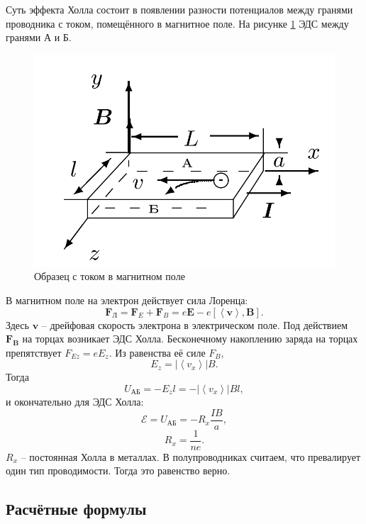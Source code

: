 \documentclass[a4paper]{article}
\newcommand{\mbf}{\mathbf}
\begin{document}
Суть эффекта Холла состоит в появлении разности потенциалов между гранями проводника с током, помещённого в магнитное поле. На рисунке \ref{образец} ЭДС между гранями А и Б.
\begin{figure}[tb]
	\centering
	\includegraphics[width=0.8\linewidth]{образец}
	\caption{Образец с током в магнитном поле}
	\label{образец}
\end{figure}
В магнитном поле на электрон действует сила Лоренца:
\begin{equation*}\label{лоренц}
	{\mbf F}_Л = {\mbf F_E}+ {\mbf F_B} = e \mathbf{E}-e \left[\left<\mathbf{v}\right>, \mathbf{B}\right].
\end{equation*}
Здесь $ \mathbf{v} $ -- дрейфовая скорость электрона в электрическом поле. Под действием $ \mathbf{F_B} $ на торцах возникает ЭДС Холла. Бесконечному накоплению заряда на торцах препятствует $ F_{E z} = e E_z $. Из равенства её силе $ F_B $,
\begin{equation*}\label{key}
	E_z = \left|\left<v_x\right>\right| B.
\end{equation*}
Тогда 
\begin{equation*}\label{key}
	U_{А Б} = -E_z l = -\left|\left<v_x\right>\right| B l,
\end{equation*}
и окончательно для ЭДС Холла:
\begin{equation}\label{e}
	\mathscr{E} = U_{А Б} = -R_x \frac{I B}{a},
\end{equation}
\begin{equation}\label{key}
	R_x = \frac{1}{n e }.
\end{equation}
$ R_x $ -- постоянная Холла в металлах. В полупроводниках считаем, что превалирует один тип проводимости. Тогда это равенство верно.
\subsection{Расчётные формулы}
\end{document}
